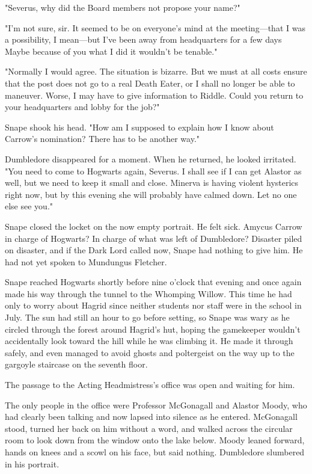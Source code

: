 "Severus, why did the Board members not propose your name?"

"I'm not sure, sir. It seemed to be on everyone's mind at the meeting—that I was a possibility, I mean—but I've been away from headquarters for a few days{\el} Maybe because of you{\el} what I did{\el} it wouldn't be tenable."

"Normally I would agree. The situation is bizarre. But we must at all costs ensure that the post does not go to a real Death Eater, or I shall no longer be able to maneuver. Worse, I may have to give information to Riddle. Could you return to your headquarters and lobby for the job?"

Snape shook his head. "How am I supposed to explain how I know about Carrow's nomination? There has to be another way."

Dumbledore disappeared for a moment. When he returned, he looked irritated. "You need to come to Hogwarts again, Severus. I shall see if I can get Alastor as well, but we need to keep it small and close. Minerva is having violent hysterics right now, but by this evening she will probably have calmed down. Let no one else see you."

Snape closed the locket on the now empty portrait. He felt sick. Amycus Carrow in charge of Hogwarts? In charge of what was left of Dumbledore? Disaster piled on disaster, and if the Dark Lord called now, Snape had nothing to give him. He had not yet spoken to Mundungus Fletcher.

Snape reached Hogwarts shortly before nine o'clock that evening and once again made his way through the tunnel to the Whomping Willow. This time he had only to worry about Hagrid since neither students nor staff were in the school in July. The sun had still an hour to go before setting, so Snape was wary as he circled through the forest around Hagrid's hut, hoping the gamekeeper wouldn't accidentally look toward the hill while he was climbing it. He made it through safely, and even managed to avoid ghosts and poltergeist on the way up to the gargoyle staircase on the seventh floor.

The passage to the Acting Headmistress's office was open and waiting for him.

The only people in the office were Professor McGonagall and Alastor Moody, who had clearly been talking and now lapsed into silence as he entered. McGonagall stood, turned her back on him without a word, and walked across the circular room to look down from the window onto the lake below. Moody leaned forward, hands on knees and a scowl on his face, but said nothing. Dumbledore slumbered in his portrait.

